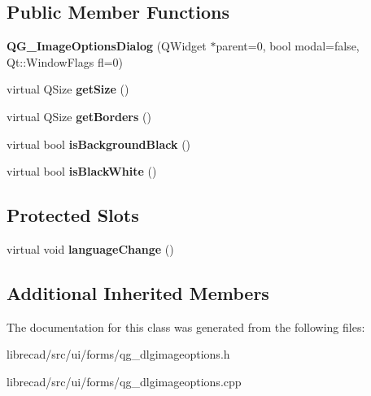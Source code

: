 \subsection*{Public Member Functions}
\begin{DoxyCompactItemize}
\item 
\hypertarget{classQG__ImageOptionsDialog_a47ceff8d86386ab74e349ff209b8ffb5}{{\bfseries Q\-G\-\_\-\-Image\-Options\-Dialog} (Q\-Widget $\ast$parent=0, bool modal=false, Qt\-::\-Window\-Flags fl=0)}\label{classQG__ImageOptionsDialog_a47ceff8d86386ab74e349ff209b8ffb5}

\item 
\hypertarget{classQG__ImageOptionsDialog_a34b677cb534b7c2074db71cacfeb95af}{virtual Q\-Size {\bfseries get\-Size} ()}\label{classQG__ImageOptionsDialog_a34b677cb534b7c2074db71cacfeb95af}

\item 
\hypertarget{classQG__ImageOptionsDialog_af7bff163c4531a3e9f2431de360c6e8d}{virtual Q\-Size {\bfseries get\-Borders} ()}\label{classQG__ImageOptionsDialog_af7bff163c4531a3e9f2431de360c6e8d}

\item 
\hypertarget{classQG__ImageOptionsDialog_a97cc7933eda8de57884526d70006203e}{virtual bool {\bfseries is\-Background\-Black} ()}\label{classQG__ImageOptionsDialog_a97cc7933eda8de57884526d70006203e}

\item 
\hypertarget{classQG__ImageOptionsDialog_a4ecbf34be10af4958a9110f6859cd000}{virtual bool {\bfseries is\-Black\-White} ()}\label{classQG__ImageOptionsDialog_a4ecbf34be10af4958a9110f6859cd000}

\end{DoxyCompactItemize}
\subsection*{Protected Slots}
\begin{DoxyCompactItemize}
\item 
\hypertarget{classQG__ImageOptionsDialog_a8558454e95c1883b4e1b023f8e031a3d}{virtual void {\bfseries language\-Change} ()}\label{classQG__ImageOptionsDialog_a8558454e95c1883b4e1b023f8e031a3d}

\end{DoxyCompactItemize}
\subsection*{Additional Inherited Members}


The documentation for this class was generated from the following files\-:\begin{DoxyCompactItemize}
\item 
librecad/src/ui/forms/qg\-\_\-dlgimageoptions.\-h\item 
librecad/src/ui/forms/qg\-\_\-dlgimageoptions.\-cpp\end{DoxyCompactItemize}
